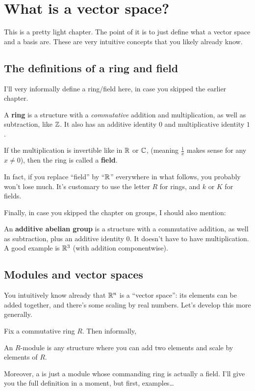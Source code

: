 \chapter{What is a vector space?}
This is a pretty light chapter.
The point of it is to just define what a vector space and a basis are.
These are very intuitive concepts that you likely already know.

\section{The definitions of a ring and field}

I'll very informally define a ring/field here,
in case you skipped the earlier chapter.
\begin{itemize}
	\ii A \textbf{ring} is a structure with a \emph{commutative}
	addition and multiplication, as well as subtraction, like $\mathbb Z$.
	It also has an additive identity $0$ and multiplicative identity $1$.

	\ii If the multiplication is invertible like in $\mathbb R$ or $\mathbb C$,
	(meaning $\frac 1x$ makes sense for any $x \neq 0$),
	then the ring is called a \textbf{field}.
\end{itemize}
In fact, if you replace ``field'' by ``$\mathbb R$'' everywhere in what follows,
you probably won't lose much.
It's customary to use the letter $R$ for rings, and $k$ or $K$ for fields.

Finally, in case you skipped the chapter on groups, I should also mention:
\begin{itemize}
	\ii An \textbf{additive abelian group} is a structure
	with a commutative addition, as well as subtraction,
	plus an additive identity $0$.
	It doesn't have to have multiplication.
	A good example is $\mathbb R^3$ (with addition componentwise).
\end{itemize}

\section{Modules and vector spaces}
You intuitively know already that $\mathbb R^n$ is a ``vector space'':
its elements can be added together,
and there's some scaling by real numbers.
Let's develop this more generally.

Fix a commutative ring $R$.
Then informally,
\begin{moral}
	An $R$-module is any structure where you can add two elements
	and scale by elements of $R$.
\end{moral}
Moreover, a  is just a module whose commanding ring
is actually a field.
I'll give you the full definition in a moment,
but first, examples\dots

